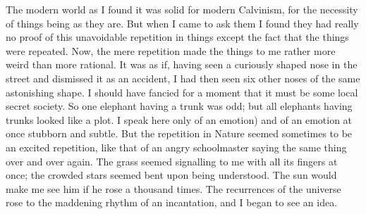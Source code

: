 \documentclass{book}
\begin{document}
The modern world as I found it was solid for modern Calvinism, for the necessity of things being as they are. But when I came to ask them I found they had really no proof of this unavoidable repetition in things except the fact that the things were repeated. Now, the mere repetition made the things to me rather more weird than more rational. It was as if, having seen a curiously shaped nose in the street and dismissed it as an accident, I had then seen six other noses of the same astonishing shape. I should have fancied for a moment that it must be some local secret society. So one elephant having a trunk was odd; but all elephants having trunks looked like a plot. I speak here only of an emotion) and of an emotion at once stubborn and subtle. But the repetition in Nature seemed sometimes to be an excited repetition, like that of an angry schoolmaster saying the same thing over and over again. The grass seemed signalling to me with all its fingers at once; the crowded stars seemed bent upon being understood. The sun would make me see him if he rose a thousand times. The recurrences of the universe rose to the maddening rhythm of an incantation, and I began to see an idea.
\end{document}

